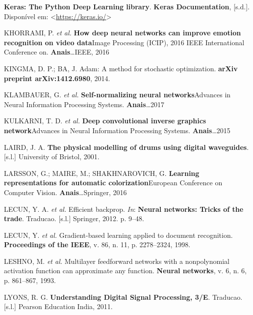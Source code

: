 \documentclass[]{article}
\begin{document}
\leavevmode\hypertarget{ref-keras}{}%
\textbf{Keras: The Python Deep Learning library}. \textbf{Keras
Documentation}, {[}s.d.{]}. Disponível em:
\textless{}\url{https://keras.io/}\textgreater{}

\leavevmode\hypertarget{ref-khorrami2016deep}{}%
KHORRAMI, P. \emph{et al.} \textbf{How deep neural networks can improve
emotion recognition on video data}Image Processing (ICIP), 2016 IEEE
International Conference on. \textbf{Anais}\ldots{}IEEE, 2016

\leavevmode\hypertarget{ref-kingma2014adam}{}%
KINGMA, D. P.; BA, J. Adam: A method for stochastic optimization.
\textbf{arXiv preprint arXiv:1412.6980}, 2014.

\leavevmode\hypertarget{ref-klambauer2017self}{}%
KLAMBAUER, G. \emph{et al.} \textbf{Self-normalizing neural
networks}Advances in Neural Information Processing Systems.
\textbf{Anais}\ldots{}2017

\leavevmode\hypertarget{ref-kulkarni2015deep}{}%
KULKARNI, T. D. \emph{et al.} \textbf{Deep convolutional inverse
graphics network}Advances in Neural Information Processing Systems.
\textbf{Anais}\ldots{}2015

\leavevmode\hypertarget{ref-laird2001physical}{}%
LAIRD, J. A. \textbf{The physical modelling of drums using digital
waveguides}. {[}s.l.{]} University of Bristol, 2001.

\leavevmode\hypertarget{ref-larsson2016learning}{}%
LARSSON, G.; MAIRE, M.; SHAKHNAROVICH, G. \textbf{Learning
representations for automatic colorization}European Conference on
Computer Vision. \textbf{Anais}\ldots{}Springer, 2016

\leavevmode\hypertarget{ref-lecun2012efficient}{}%
LECUN, Y. A. \emph{et al.} Efficient backprop. \emph{In}: \textbf{Neural
networks: Tricks of the trade}. Traducao. {[}s.l.{]} Springer, 2012. p.
9--48.

\leavevmode\hypertarget{ref-lecun1998gradient}{}%
LECUN, Y. \emph{et al.} Gradient-based learning applied to document
recognition. \textbf{Proceedings of the IEEE}, v. 86, n. 11, p.
2278--2324, 1998.

\leavevmode\hypertarget{ref-leshno93}{}%
LESHNO, M. \emph{et al.} Multilayer feedforward networks with a
nonpolynomial activation function can approximate any function.
\textbf{Neural networks}, v. 6, n. 6, p. 861--867, 1993.

\leavevmode\hypertarget{ref-lyons2011understanding}{}%
LYONS, R. G. \textbf{Understanding Digital Signal Processing, 3/E}.
Traducao. {[}s.l.{]} Pearson Education India, 2011.
\end{document}
